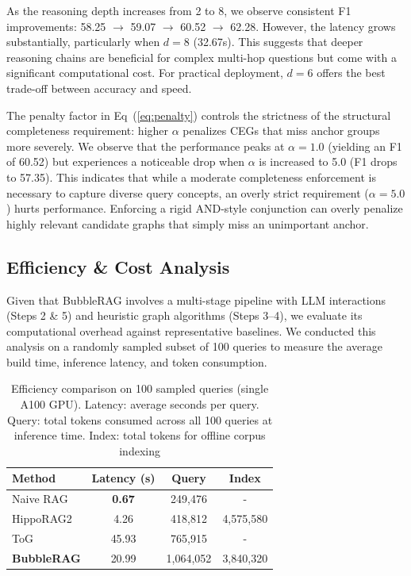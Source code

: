  As the reasoning depth increases from 2 to 8, we observe consistent F1 improvements: 58.25 $\rightarrow$ 59.07 $\rightarrow$ 60.52 $\rightarrow$ 62.28. However, the latency grows substantially, particularly when $d=8$ (32.67s). This suggests that deeper reasoning chains are beneficial for complex multi-hop questions but come with a significant computational cost. For practical deployment, $d=6$ offers the best trade-off between accuracy and speed.

 The penalty factor in Eq~(\ref{eq:penalty}) controls the strictness of the structural completeness requirement: higher $\alpha$ penalizes CEGs that miss anchor groups more severely. We observe that the performance peaks at $\alpha = 1.0$ (yielding an F1 of 60.52) but experiences a noticeable drop when $\alpha$ is increased to 5.0 (F1 drops to 57.35). This indicates that while a moderate completeness enforcement is necessary to capture diverse query concepts, an overly strict requirement ($\alpha=5.0$) hurts performance. Enforcing a rigid AND-style conjunction can overly penalize highly relevant candidate graphs that simply miss an unimportant anchor.

\subsection{Efficiency \& Cost Analysis}
\label{sec:efficiency}

Given that BubbleRAG involves a multi-stage pipeline with LLM interactions (Steps 2 \& 5) and heuristic graph algorithms (Steps 3--4), we evaluate its computational overhead against representative baselines. We conducted this analysis on a randomly sampled subset of 100 queries to measure the average build time, inference latency, and token consumption.

\begin{table}[h]
    \centering
    \caption{Efficiency comparison on 100 sampled queries (single A100 GPU). Latency: average seconds per query. Query: total tokens consumed across all 100 queries at inference time. Index: total tokens for offline corpus indexing}
    \label{tab:efficiency}
    \renewcommand{\arraystretch}{1.1}
    \setlength{\tabcolsep}{8pt}
    \begin{tabular}{lccc}
    \toprule
    \textbf{Method} & \textbf{Latency (s)} & \textbf{Query} & \textbf{Index} \\
    \midrule
    Naive RAG & \textbf{0.67} & 249,476 & - \\
    HippoRAG2 & 4.26 & 418,812 & 4,575,580\\
    ToG & 45.93 & 765,915 & - \\
    \textbf{BubbleRAG} & 20.99 & 1,064,052 & 3,840,320 \\
    \bottomrule
    \end{tabular}
\end{table}

